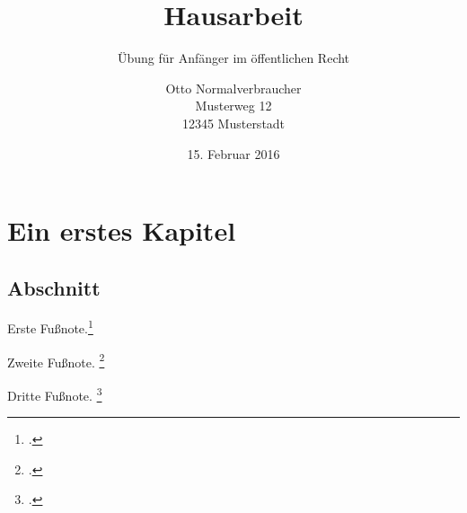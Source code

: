 \documentclass{hausarbeit-jura}
\begin{document}

\title{Hausarbeit}
\subtitle{Übung für Anfänger im öffentlichen Recht}
\author{Otto Normalverbraucher\\Musterweg 12\\12345 Musterstadt}
\date{15. Februar 2016}
\maketitle

\tableofcontents %



\chapter{Ein erstes Kapitel}\label{chap:ErstesKapitel}

\section{Abschnitt}
\blindtext[4]


Erste Fußnote.\footcite[33]{larenz:methoden}

Zweite Fußnote. \footcite[§~7 Rn.~7]{maurer:allgverwr}

Dritte Fußnote. \footcite[Rn.~204]{medicus:br}
\end{document}
